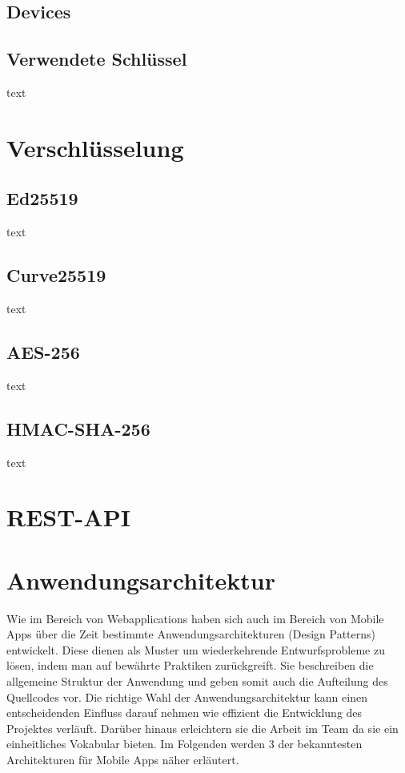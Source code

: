     \subsection{Devices}


    \subsection{Verwendete Schlüssel}\label{subsec:verwendete-schlussel}
    text


    \section{Verschlüsselung}\label{sec:verschlusselung}

    \subsection{Ed25519}\label{subsec:ed25519}
    text

    \subsection{Curve25519}\label{subsec:curve25519}
    text

    \subsection{AES-256}\label{subsec:aes-256}
    text

    \subsection{HMAC-SHA-256}\label{subsec:hmac-sha-256}
    text

    \section{REST-API}\label{sec:rest}

    \cite{dazer2012restful}

    \newpage
    \section{Anwendungsarchitektur}\label{sec:anwendungsarchitektur}
    Wie im Bereich von Webapplications haben sich auch im Bereich von Mobile Apps über die Zeit bestimmte Anwendungsarchitekturen (Design Patterns) entwickelt.
    Diese dienen als Muster um wiederkehrende Entwurfsprobleme zu lösen, indem man auf bewährte Praktiken zurückgreift.
    Sie beschreiben die allgemeine Struktur der Anwendung und geben somit auch die Aufteilung des Quellcodes vor.
    Die richtige Wahl der Anwendungsarchitektur kann einen entscheidenden Einfluss darauf nehmen wie effizient die Entwicklung des Projektes verläuft.
    Darüber hinaus erleichtern sie die Arbeit im Team da sie ein einheitliches Vokabular bieten.
    Im Folgenden werden 3 der bekanntesten Architekturen für Mobile Apps näher erläutert.

